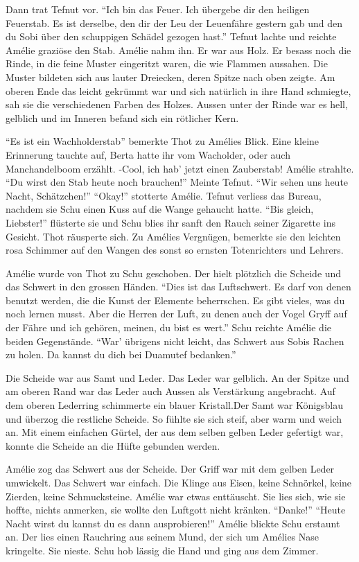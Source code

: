 \documentclass[11pt,titlepage,a5paper]{book}
\begin{document}
Dann trat Tefnut vor. "`Ich bin das Feuer. Ich übergebe dir den heiligen Feuerstab. Es ist derselbe, den dir der Leu der Leuenfähre gestern gab und den du Sobi über den schuppigen Schädel gezogen hast."' Tefnut lachte und reichte Amélie graziöse den Stab. Amélie nahm ihn. Er war aus Holz. Er besass noch die Rinde, in die feine Muster eingeritzt waren, die wie Flammen aussahen. Die Muster bildeten sich aus lauter Dreiecken, deren Spitze nach oben zeigte. Am oberen Ende das leicht gekrümmt war und sich natürlich in ihre Hand schmiegte, sah sie die verschiedenen Farben des Holzes. Aussen unter der Rinde war es hell, gelblich und im Inneren befand sich ein rötlicher Kern.

 "`Es ist ein Wachholderstab"' bemerkte Thot zu Amélies Blick. Eine kleine Erinnerung tauchte auf, Berta hatte ihr vom Wacholder, oder auch Manchandelboom erzählt. -Cool, ich hab' jetzt einen Zauberstab! Amélie strahlte. "`Du wirst den Stab heute noch brauchen!"' Meinte Tefnut. "`Wir sehen uns heute Nacht, Schätzchen!"' "`Okay!"' stotterte Amélie. Tefnut verliess das Bureau, nachdem sie Schu einen Kuss auf die Wange gehaucht hatte. "`Bis gleich, Liebster!"' flüsterte sie und Schu blies ihr sanft den Rauch seiner Zigarette ins Gesicht. Thot räusperte sich. Zu Amélies Vergnügen, bemerkte sie den leichten rosa Schimmer auf den Wangen des sonst so ernsten Totenrichters und Lehrers.

Amélie wurde von Thot zu Schu geschoben. Der hielt plötzlich die Scheide und das Schwert in den grossen Händen. "`Dies ist das Luftschwert. Es darf von denen benutzt werden, die die Kunst der Elemente beherrschen. Es gibt vieles, was du noch lernen musst. Aber die Herren der Luft, zu denen auch der Vogel Gryff auf der Fähre und ich gehören, meinen, du bist es wert."' Schu reichte Amélie die beiden Gegenstände. "`War' übrigens nicht leicht, das Schwert aus Sobis Rachen zu holen. Da kannst du dich bei Duamutef bedanken."'

Die Scheide war aus Samt und Leder. Das Leder war gelblich. An der Spitze und am oberen Rand war das Leder auch Aussen als Verstärkung angebracht. Auf dem oberen Lederring schimmerte ein blauer Kristall.Der Samt war Königsblau und überzog die restliche Scheide. So fühlte sie sich steif, aber warm und weich an. Mit einem einfachen Gürtel, der aus dem selben gelben Leder gefertigt war, konnte die Scheide an die Hüfte gebunden werden. 

Amélie zog das Schwert aus der Scheide. Der Griff war mit dem gelben Leder umwickelt. Das Schwert war einfach. Die Klinge aus Eisen, keine Schnörkel, keine Zierden, keine Schmucksteine. Amélie war etwas enttäuscht. Sie lies sich, wie sie hoffte, nichts anmerken, sie wollte den Luftgott nicht kränken. "`Danke!"' "`Heute Nacht wirst du kannst du es dann ausprobieren!"' Amélie blickte Schu erstaunt an. Der lies einen Rauchring aus seinem Mund, der sich um Amélies Nase kringelte. Sie nieste. Schu hob lässig die Hand und ging aus dem Zimmer.
\end{document}
